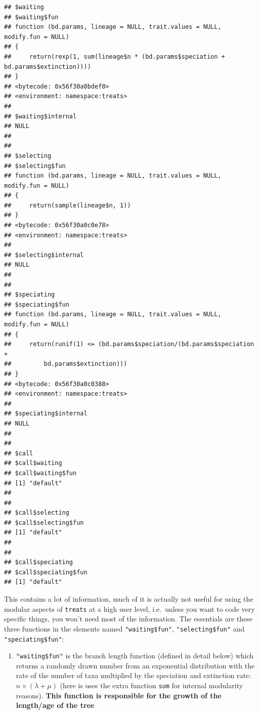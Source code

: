 \documentclass[
]{book}
\newenvironment{Shaded}{\begin{snugshade}}{\end{snugshade}}
\newcommand{\DecValTok}[1]{\textcolor[rgb]{0.00,0.00,0.81}{#1}}
\newcommand{\KeywordTok}[1]{\textcolor[rgb]{0.13,0.29,0.53}{\textbf{#1}}}
\newcommand{\NormalTok}[1]{#1}
\newcommand{\OperatorTok}[1]{\textcolor[rgb]{0.81,0.36,0.00}{\textbf{#1}}}
\newcommand{\StringTok}[1]{\textcolor[rgb]{0.31,0.60,0.02}{#1}}
\providecommand{\tightlist}{%
  \setlength{\itemsep}{0pt}\setlength{\parskip}{0pt}}
\begin{document}
\begin{verbatim}
## $waiting
## $waiting$fun
## function (bd.params, lineage = NULL, trait.values = NULL, modify.fun = NULL) 
## {
##     return(rexp(1, sum(lineage$n * (bd.params$speciation + bd.params$extinction))))
## }
## <bytecode: 0x56f30a0bdef0>
## <environment: namespace:treats>
## 
## $waiting$internal
## NULL
## 
## 
## $selecting
## $selecting$fun
## function (bd.params, lineage = NULL, trait.values = NULL, modify.fun = NULL) 
## {
##     return(sample(lineage$n, 1))
## }
## <bytecode: 0x56f30a0c0e78>
## <environment: namespace:treats>
## 
## $selecting$internal
## NULL
## 
## 
## $speciating
## $speciating$fun
## function (bd.params, lineage = NULL, trait.values = NULL, modify.fun = NULL) 
## {
##     return(runif(1) <= (bd.params$speciation/(bd.params$speciation + 
##         bd.params$extinction)))
## }
## <bytecode: 0x56f30a0c0388>
## <environment: namespace:treats>
## 
## $speciating$internal
## NULL
## 
## 
## $call
## $call$waiting
## $call$waiting$fun
## [1] "default"
## 
## 
## $call$selecting
## $call$selecting$fun
## [1] "default"
## 
## 
## $call$speciating
## $call$speciating$fun
## [1] "default"
\end{verbatim}

This contains a lot of information, much of it is actually not useful for using the modular aspects of \texttt{treats} at a high user level, i.e.~unless you want to code very specific things, you won't need most of the information. The essentials are these three functions in the elements named \texttt{"waiting\$fun"}, \texttt{"selecting\$fun"} and \texttt{"speciating\$fun"}:

\begin{enumerate}
\def\labelenumi{\arabic{enumi}.}
\tightlist
\item
  \texttt{"waiting\$fun"} is the branch length function (defined in detail below) which returns a randomly drawn number from an exponential distribution with the rate of the number of taxa multiplied by the speciation and extinction rate: \(n \times (\lambda + \mu)\) (here is uses the extra function \texttt{sum} for internal modularity reasons). \textbf{This function is responsible for the growth of the length/age of the tree}
\end{enumerate}

\begin{Shaded}
\end{Shaded}
\end{document}
